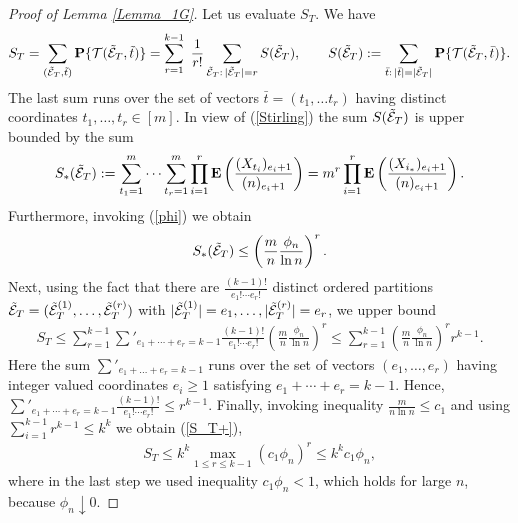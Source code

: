 \documentclass[11pt, a4paper]{article}
\newcommand{\E}{{\bf{E}}}
\newcommand{\PP}{{\bf{P}}}
\begin{document}
\begin{proof}[Proof of Lemma \ref{Lemma_1G}]
Let us evaluate $S_T$.
We have 
\begin{align*}
S_T
=
\sum_{({\tilde {\cal E}}_T,{\tilde t})}
\PP\{{\cal T}({\tilde {\cal E}}_T,{\tilde t})\}
=
\sum_{r=1}^{k-1}
\
\frac{1}{r!}
\sum_{{\tilde {\cal E}}_T:\,|{\tilde {\cal E}}_T|=r}
S({\tilde {\cal E}}_T),
\qquad
S({\tilde {\cal E}}_T)
:=
\sum_{{\bar t}:\, |{\bar t}|=|{\tilde{\cal E}}_T|}
\PP\{{\cal T}({\tilde {\cal E}}_T,{\bar t})\}.
\end{align*}
The last sum runs over the set of 
vectors ${\bar t}=(t_1,\dots t_r)$ having distinct coordinates $t_1,\dots, t_r\in [m]$.
In view of (\ref{Stirling})
the sum $S({\tilde{\cal E}}_T)$ is upper bounded by the sum
\begin{displaymath}
S_*({\tilde{\cal E}}_T)
:=
\sum_{t_1=1}^m\cdots\sum_{t_r=1}^m
\prod_{i=1}^r
\E
\left(
\frac{(X_{t_i})_{e_i+1}}{(n)_{e_i+1}}
\right)
=m^r
\prod_{i=1}^r
\E
\left(
\frac{(X_{i_*})_{e_i+1}}{(n)_{e_i+1}}
\right).
\end{displaymath}
Furthermore, invoking (\ref{phi}) we obtain
\begin{align*}
S_*({\tilde{\cal E}}_T)
\le
\left(
\frac{m}{n}\frac{\phi_n}{\ln n}
\right)^r.
\end{align*}
Next,
using the fact that there are $\frac{(k-1)!}{e_1!\cdots e_r!}$ distinct ordered partitions
${\tilde {\cal E}}_T=({\tilde {\cal E}}_T^{(1)},\dots, {\tilde {\cal E}}_T^{(r)})$
with $|{\tilde {\cal E}}_T^{(1)}|=e_1,
\dots, |{\tilde {\cal E}}_T^{(r)}|=e_r$, we upper bound
\begin{align*}
S_T
\le 
\sum_{r=1}^{k-1}
\sum'_{e_1+\cdots+e_r=k-1}
\frac{(k-1)!}{e_1!\cdots e_r!} 
\left(
\frac{m}{n}\frac{\phi_n}{\ln n}
\right)^r
\le 
\sum_{r=1}^{k-1}
\left(
\frac{m}{n}\frac{\phi_n}{\ln n}
\right)^r
r^{k-1}.
\end{align*}
Here the sum $\sum'_{e_1+\dots+e_r=k-1}$ runs over the set of vectors
$(e_1,\dots, e_r)$ having integer valued coordinates $e_i\ge 1$ 
satisfying $e_ 1+\cdots+e_r=k-1$. 
Hence, $\sum'_{e_1+\cdots+e_r=k-1}
\frac{(k-1)!}{e_1!\cdots e_r!} 
\le r^{k-1}$.
Finally, invoking inequality $\frac{m}{n\ln n}\le c_1$ 
and using $\sum_{i=1}^{k-1}r^{k-1}\le k^k$ we obtain (\ref{S_T+}),
\begin{align*}
S_T
\le
k^k\max_{1\le r\le k-1}\left(c_1\phi_n\right)^r
\le 
k^kc_1\phi_n,
\end{align*}
where in the last step we used inequality $c_1\phi_n<1$,
which holds for large $n$, because $\phi_n\downarrow 0$.



\bigskip


\end{proof}
\end{document}

